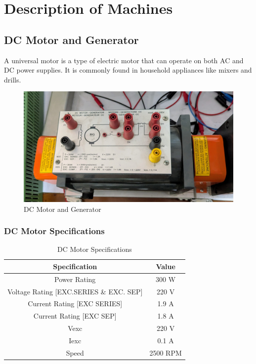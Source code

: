 \documentclass[a4paper,12pt]{article}
\begin{document}
	\section{Description of Machines}
	
	\subsection{DC Motor and Generator}
	A universal motor is a type of electric motor that can operate on both AC and DC power supplies. It is commonly found in household appliances like mixers and drills.
	\begin{figure}[H]
		\centering
		\includegraphics[width=.7\linewidth, height=0.2\textheight]{"Images/6"}
		\caption{DC Motor and Generator}
	\end{figure}
	
	\subsubsection{DC Motor Specifications}
	\begin{table}[H]
		\centering
		\caption{DC Motor Specifications}
		\begin{tabular}{| c | c |}
			\hline
			\textbf{Specification} & \textbf{Value} \\ \hline
			Power Rating & 300 W\\ \hline
			Voltage Rating [EXC.SERIES \& EXC. SEP] & 220 V \\ \hline
			Current Rating [EXC SERIES] & 1.9 A \\ \hline
			Current Rating [EXC SEP] & 1.8 A \\ \hline
			Vexc & 220 V \\ \hline
			Iexc & 0.1 A \\ \hline
			Speed & 2500 RPM \\ \hline
			
		\end{tabular}
		
		
		\label{tab:2}
	\end{table}
	
\end{document}
